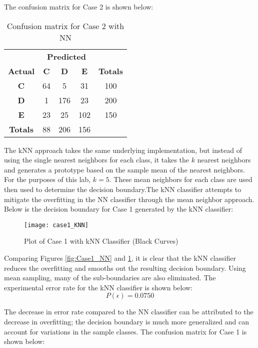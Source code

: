 \documentclass{article}
\begin{document}
The confusion matrix for Case 2 is shown below:
\begin{table}[H]
    \centering
    \begin{tabular}{c|c c c|c|}
        & \multicolumn{3}{c|}{\textbf{Predicted}} \\
        \textbf{Actual} & \textbf{C} & \textbf{D} & \textbf{E} & \textbf{Totals} \\
        \hline
        \textbf{C} & 64 \cellcolor[gray]{.8} & 5 & 31 & 100 \\
        \textbf{D} & 1 & 176 \cellcolor[gray]{.8} & 23 & 200\\
        \textbf{E} & 23 & 25 & 102 \cellcolor[gray]{.8} & 150\\\hline
        \textbf{Totals} & 88 & 206 & 156\\
        \cline{1-4}
    \end{tabular}
    \caption{Confusion matrix for Case 2 with NN}
    \label{tab:Case2_NN_error}
\end{table}

The kNN approach takes the same underlying implementation, but instead of using the single nearest neighbors for each class, it takes the $k$ nearest neighbors and generates a prototype based on the sample mean of the nearest neighbors. For the purposes of this lab, $k = 5$. These mean neighbors for each class are used then used to determine the decision boundary.The kNN classifier attempts to mitigate the overfitting in the NN classifier through the mean neighbor approach. Below is the decision boundary for Case 1 generated by the kNN classifier:

\begin{figure}[H]
\caption{Plot of Case 1 with kNN Classifier (Black Curves)}
\centering
\texttt{[image: case1\_KNN]}
\label{fig:Case1_KNN}
\end{figure}

Comparing Figures \ref{fig:Case1_NN} and \ref{fig:Case1_KNN}, it is clear that the kNN classifier reduces the overfitting and smooths out the resulting decision boundary. Using mean sampling, many of the sub-boundaries are also eliminated. The experimental error rate for the kNN classifier is shown below:
\begin{equation}
    P(\epsilon) = 0.0750
\end{equation}

The decrease in error rate compared to the NN classifier can be attributed to the decrease in overfitting; the decision boundary is much more generalized and can account for variations in the sample classes. The confusion matrix for Case 1 is shown below:
\end{document}
